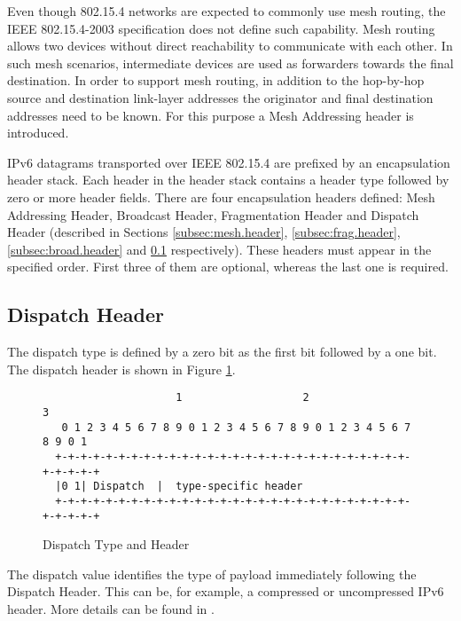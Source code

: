 \documentclass[12pt, titlepage, a4paper]{report}
\newenvironment{mylisting}
{\begin{list}{}{\setlength{\leftmargin}{1em}}\item\footnotesize}
{\end{list}}
\begin{document}
Even though 802.15.4 networks are expected to commonly use mesh routing, the IEEE 802.15.4-2003 \cite{ieee802.15.4} specification does not define such capability. Mesh routing allows two devices  without direct reachability to communicate with each other. In such mesh scenarios, intermediate devices are used as forwarders towards the final destination. In order to support mesh routing, in addition to the hop-by-hop source and destination link-layer addresses the originator and final destination addresses need to be known. For this purpose a Mesh Addressing header is introduced.


IPv6 datagrams transported over IEEE 802.15.4 are prefixed by an encapsulation header stack. Each header in the header stack contains a header type followed by zero or more header fields.  There are four encapsulation headers defined: Mesh Addressing Header, Broadcast Header, Fragmentation Header and Dispatch Header (described in Sections \ref{subsec:mesh.header}, \ref{subsec:frag.header},\ref{subsec:broad.header} and \ref{subsec:dispatch.header} respectively). These headers must appear in the specified order. First three of them are optional, whereas the last one is required.

\subsection{Dispatch Header}\label{subsec:dispatch.header}
The dispatch type is defined by a zero bit as the first bit followed by a one bit. The dispatch header is shown in Figure \ref{fig:dispatch.header}.

\begin{figure}[htp]
\centering
\begin{mylisting}
\begin{verbatim}
                     1                   2                   3
   0 1 2 3 4 5 6 7 8 9 0 1 2 3 4 5 6 7 8 9 0 1 2 3 4 5 6 7 8 9 0 1
  +-+-+-+-+-+-+-+-+-+-+-+-+-+-+-+-+-+-+-+-+-+-+-+-+-+-+-+-+-+-+-+-+
  |0 1| Dispatch  |  type-specific header
  +-+-+-+-+-+-+-+-+-+-+-+-+-+-+-+-+-+-+-+-+-+-+-+-+-+-+-+-+-+-+-+-+
\end{verbatim}
\end{mylisting}
\caption{Dispatch Type and Header}\label{fig:dispatch.header}
\end{figure}
The dispatch value identifies the type of payload immediately following the Dispatch Header. This can  be, for example, a compressed or uncompressed IPv6 header. More details can be found in \cite{rfc4944}.
\end{document}
